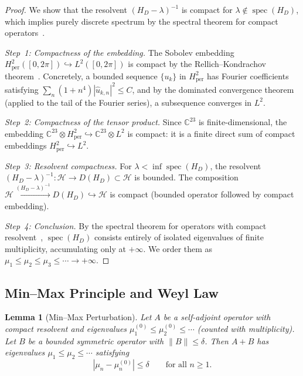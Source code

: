\documentclass[11pt,a4paper]{article}
\theoremstyle{plain}
\newtheorem{lemma}[theorem]{Lemma}
\theoremstyle{remark}
\newcommand{\C}{\mathbb{C}}
\newcommand{\HH}{\mathcal{H}}
\DeclareMathOperator{\spec}{spec}
\newcommand{\norm}[1]{\lVert #1 \rVert}
\begin{document}
\begin{proof}
We show that the resolvent $(H_D-\lambda)^{-1}$ is compact for
$\lambda\notin\spec(H_D)$, which implies purely discrete spectrum
by the spectral theorem for compact operators~\cite{reed-simon1978}.

\emph{Step~1: Compactness of the embedding.}
The Sobolev embedding $H^2_{\mathrm{per}}([0,2\pi])\hookrightarrow L^2([0,2\pi])$
is compact by the Rellich--Kondrachov
theorem~\cite{adams-fournier2003}.  Concretely, a bounded sequence
$\{u_k\}$ in $H^2_{\mathrm{per}}$ has Fourier coefficients satisfying
$\sum_n(1+n^4)|\hat{u}_{k,n}|^2\leq C$, and by the dominated convergence
theorem (applied to the tail of the Fourier series), a subsequence
converges in $L^2$.

\emph{Step~2: Compactness of the tensor product.}
Since $\C^{23}$ is finite-dimensional, the embedding
$\C^{23}\otimes H^2_{\mathrm{per}}\hookrightarrow\C^{23}\otimes L^2$
is compact: it is a finite direct sum of compact embeddings
$H^2_{\mathrm{per}}\hookrightarrow L^2$.

\emph{Step~3: Resolvent compactness.}
For $\lambda<\inf\spec(H_D)$, the resolvent
$(H_D-\lambda)^{-1}\colon\HH\to D(H_D)\subset\HH$ is bounded.
The composition
$\HH\xrightarrow{(H_D-\lambda)^{-1}}D(H_D)\hookrightarrow\HH$
is compact (bounded operator followed by compact embedding).

\emph{Step~4: Conclusion.}
By the spectral theorem for operators with compact
resolvent~\cite[Thm.~XIII.64]{reed-simon1978}, $\spec(H_D)$ consists
entirely of isolated eigenvalues of finite multiplicity, accumulating
only at $+\infty$.  We order them as
$\mu_1\leq\mu_2\leq\mu_3\leq\cdots\to+\infty$.
\end{proof}

\subsection{Min--Max Principle and Weyl Law}

\begin{lemma}[Min--Max Perturbation]\label{lem:minmax}
Let $A$ be a self-adjoint operator with compact resolvent and eigenvalues
$\mu_1^{(0)}\leq\mu_2^{(0)}\leq\cdots$ (counted with multiplicity).
Let $B$ be a bounded symmetric operator with $\norm{B}\leq\delta$.
Then $A+B$ has eigenvalues $\mu_1\leq\mu_2\leq\cdots$ satisfying
\begin{equation}\label{eq:minmax-bound}
  |\mu_n-\mu_n^{(0)}|\leq\delta\qquad\text{for all }n\geq 1.
\end{equation}
\end{lemma}
\end{document}
